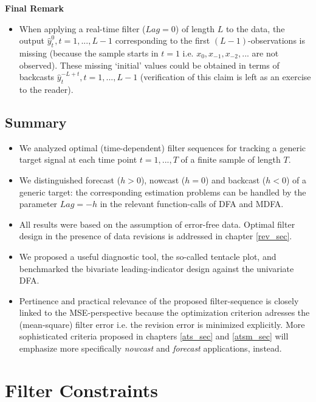 \documentclass[a4paper]{book}
\begin{document}
\textbf{Final Remark}
\begin{itemize}
\item When applying a real-time  filter ($Lag=0$) of length $L$ to the data, the output $\hat{y}_{t}^0,t=1,...,L-1$ corresponding to the first $(L-1)$-observations is missing (because the sample starts in $t=1$ i.e. $x_0,x_{-1},x_{-2},...$ are not observed). These missing `initial' values could be obtained in terms of backcasts $\hat{y}_t^{-L+t}, t=1,...,L-1$ (verification of this claim is left as an exercise to the reader).   
\end{itemize}


\section{Summary}

\begin{itemize}
\item We analyzed optimal (time-dependent) filter sequences for tracking a generic target signal at each time point $t=1,...,T$ of a finite sample of length $T$. 
\item We distinguished forecast ($h>0$), nowcast ($h=0$) and backcast ($h<0$) of a generic target: the corresponding estimation problems can be handled by the parameter $Lag=-h$ in the relevant function-calls of DFA and MDFA.
\item All results were based on the assumption of error-free data. Optimal filter design in the presence of data revisions is addressed in chapter \ref{rev_sec}. 
\item We proposed a useful diagnostic tool, the so-called tentacle plot, and benchmarked the bivariate leading-indicator design against the univariate DFA.
\item Pertinence and practical relevance of the proposed filter-sequence is closely linked to the MSE-perspective because the optimization criterion adresses the (mean-square) filter error i.e. the revision error is minimized explicitly. More sophisticated criteria proposed in chapters \ref{ats_sec} and \ref{atsm_sec} will emphasize more specifically \emph{nowcast} and \emph{forecast} applications, instead.
\end{itemize}




\chapter{Filter Constraints}\label{con_sec}
\end{document}
